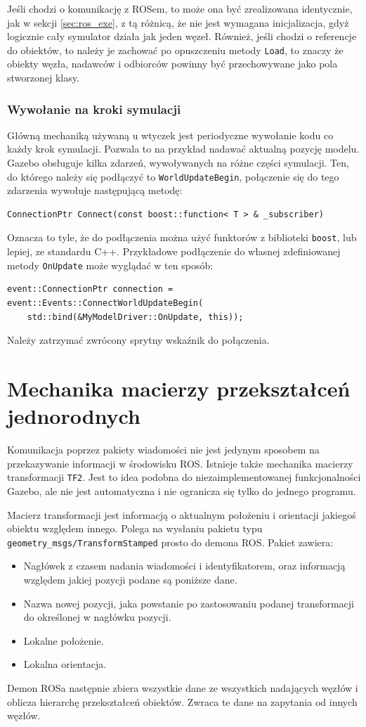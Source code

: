 		Jeśli chodzi o komunikację z ROSem, to może ona być zrealizowana identycznie, jak w sekcji \ref{sec:ros_exe}, 
		z tą różnicą, że nie jest wymagana inicjalizacja, gdyż logicznie cały symulator działa jak jeden węzeł.
		Również, jeśli chodzi o referencje do obiektów, to należy je zachować po opuszczeniu metody \texttt{Load}, to znaczy
		że obiekty węzła, nadawców i odbiorców powinny być przechowywane jako pola stworzonej klasy.

		\subsubsection{Wywołanie na kroki symulacji}
			Główną mechaniką używaną u wtyczek jest periodyczne wywołanie kodu co każdy krok symulacji.
			Pozwala to na przykład nadawać aktualną pozycję modelu.
			Gazebo obsługuje kilka zdarzeń, wywoływanych na różne części symulacji.
			Ten, do którego należy się podłączyć to \texttt{WorldUpdateBegin}, połączenie się do tego zdarzenia wywołuje następującą metodę:
			\begin{verbatim}
ConnectionPtr Connect(const boost::function< T > & _subscriber)	
			\end{verbatim}
			Oznacza to tyle, że do podłączenia można użyć funktorów z biblioteki \texttt{boost}, lub lepiej, ze standardu C++.
			Przykładowe podłączenie do własnej zdefiniowanej metody \texttt{OnUpdate} może wyglądać w ten sposób:
			\begin{verbatim}
event::ConnectionPtr connection = event::Events::ConnectWorldUpdateBegin(
	std::bind(&MyModelDriver::OnUpdate, this));
			\end{verbatim}
			Należy zatrzymać zwrócony sprytny wskaźnik do połączenia.
			
\section{Mechanika macierzy przekształceń jednorodnych}
	\label{sec:frames}
	Komunikacja poprzez pakiety wiadomości nie jest jedynym sposobem na przekazywanie informacji w środowisku ROS.
	Istnieje także mechanika macierzy transformacji \texttt{TF2}.
	Jest to idea podobna do niezaimplementowanej funkcjonalności Gazebo, ale nie jest automatyczna i nie ogranicza się tylko do jednego programu.
	
	Macierz transformacji jest informacją o aktualnym położeniu i orientacji jakiegoś obiektu względem innego.
	Polega na wysłaniu pakietu typu \texttt{geometry\_msgs/TransformStamped} prosto do demona ROS.
	Pakiet zawiera:
	\begin{itemize}
		\item Nagłówek z czasem nadania wiadomości i identyfikatorem, oraz informacją względem jakiej pozycji podane są poniższe dane.
		\item Nazwa nowej pozycji, jaka powstanie po zastosowaniu podanej transformacji do określonej w nagłówku pozycji.
		\item Lokalne położenie.
		\item Lokalna orientacja.
	\end{itemize}
	Demon ROSa następnie zbiera wszystkie dane ze wszystkich nadających węzłów i oblicza hierarchę przekształceń obiektów.
	Zwraca te dane na zapytania od innych węzłów.
	

